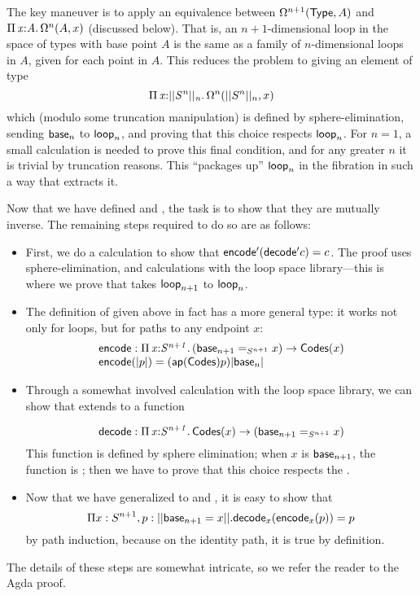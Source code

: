 The key maneuver is to apply an equivalence between
$\Omega^{n+1}(\mathsf{Type},A)$ and $\textnormal{$\Pi$}\,\mathit{x} \mathit{:} \mathit{A}.\,\mathit{}{\Omega^n(A,x)}$
(discussed below).  That is,
an $n+1$-dimensional loop in the space of types with base point $A$ is
the same as a family of $n$-dimensional loops in $A$, given for each
point in $A$.  This reduces the problem to giving an element of type
\[
\textnormal{$\Pi$}\,\mathit{x} \mathit{:} \mathit{||S^n||_n}.\,\mathit{}{\Omega^n(||S^n||_n,x)}
\]
which (modulo some truncation manipulation) is defined by
sphere-elimination, sending $\mathsf{base}_n$ to $\mathsf{loop}_n$, and
proving that this choice respects $\mathsf{loop}_n$.  For $n=1$, a small
calculation is needed to prove this final condition, and for any greater $n$
it is trivial by truncation reasons.  This ``packages up''
$\mathsf{loop}_n$ in the  fibration in such a way that
 extracts it.    

Now that we have defined  and , the task is to
show that they are mutually inverse.  The remaining steps required to do
so are as follows:
\begin{itemize}
\item First, we do a calculation to show that
  $\mathsf{encode'}(\mathsf{decode'} c) = c$.  The proof uses
  sphere-elimination, and calculations with the loop space
  library---this is where we prove that  takes
  $\mathsf{loop}_{n+1}$  to $\mathsf{loop}_n$.

\item The definition of  given above in fact has a more
  general type: it works not only for loops, but for paths to any
  endpoint $x$:
\[
\begin{array}{l}
\mathsf{encode} : \textnormal{$\Pi$}\,\mathit{x} \mathit{:} \mathit{S^{n+1}}.\,\mathit{} (\mathsf{base}_{n+1} =_{S^{n+1}} x) \to \mathsf{Codes}(x)\\
\mathsf{encode}(|p|) = (\mathsf{ap}(\mathsf{Codes}) p) |\mathsf{base}_n|
\end{array}
\]

\item Through a somewhat involved calculation with the loop space library,
  we can show that  extends to a function

\[
\mathsf{decode} : \textnormal{$\Pi$}\,\mathit{x} \mathit{:} \mathit{S^{n+1}}.\,\mathit{} \mathsf{Codes}(x) \to (\mathsf{base}_{n+1} =_{S^{n+1}} x)
\]
This function is defined by sphere elimination; 
when $x$ is $\mathsf{base}_{n+1}$, the function is ; then
we have to prove that this choice respects the . 

\item Now that we have generalized to  and , it
  is easy to show that 
  \[
  \Pi x : S^{n+1}, p : || \mathsf{base}_{n+1} = x ||.  \mathsf{decode}_x(\mathsf{encode}_x(p)) = p
  \] by path
  induction, because on the identity path, it is true by definition.
\end{itemize}
%
The details of these steps are somewhat intricate, so we refer the
reader to the Agda proof.  

